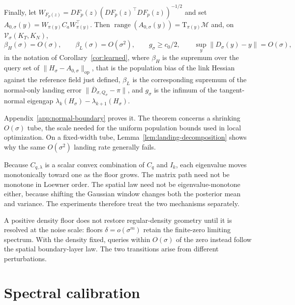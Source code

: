 \documentclass[10pt]{article}
\theoremstyle{c2fup}
\newcommand{\M}{\mathcal{M}}
\newcommand{\T}{\mathrm{T}}
\newcommand{\op}{\mathrm{op}}
\newcommand{\range}{\operatorname{range}}
\begin{document}
\begin{theorem}
Finally, let
$W_{F_p(z)}=DF_p(z)(DF_p(z)^\top DF_p(z))^{-1/2}$ and set
$A_{0,\sigma}(y)=W_{\pi(y)}C_aW_{\pi(y)}^\top$.  Then
$\range(A_{0,\sigma}(y))=\T_{\pi(y)}\M$ and, on
$\mathcal V_\sigma(K_T,K_N)$,
\begin{equation}
  \beta_H(\sigma)=O(\sigma),\qquad
  \beta_L(\sigma)=O(\sigma^2),\qquad
  g_\sigma\ge c_0/2,\qquad
  \sup_y\|D_\sigma(y)-y\|=O(\sigma),
  \label{eq:normal-boundary-rates}
\end{equation}
in the notation of Corollary~\ref{cor:learned}, where $\beta_H$ is the
supremum over the query set of $\|H_\sigma-A_{0,\sigma}\|_\op$, that is the
population bias of the link Hessian against the reference field just defined,
$\beta_L$ is the corresponding supremum of the normal-only landing error
$\|\overline D_{\sigma,Q_\sigma}-\pi\|$, and $g_\sigma$ is the infimum of the
tangent-normal eigengap $\lambda_k(H_\sigma)-\lambda_{k+1}(H_\sigma)$.
\end{theorem}

Appendix~\ref{app:normal-boundary} proves it.  The theorem concerns a shrinking $O(\sigma)$ tube, the scale needed for the
uniform population bounds used in local optimization.  On a fixed-width
tube, Lemma~\ref{lem:landing-decomposition} shows why the same
$O(\sigma^2)$ landing rate generally fails.

Because $C_{q,\lambda}$ is a scalar convex combination of $C_q$ and $I_k$, each eigenvalue moves monotonically toward one as the floor grows.  The matrix path need not be monotone in Loewner order.  The spatial law need not be eigenvalue-monotone either, because shifting the Gaussian window changes both the posterior mean and variance.  The experiments therefore treat the two mechanisms separately.

\begin{takeawaybox}
A positive density floor does not restore regular-density geometry until it is resolved at the noise scale: floors $\delta=o(\sigma^m)$ retain the finite-zero limiting spectrum.  With the density fixed, queries within $O(\sigma)$ of the zero instead follow the spatial boundary-layer law.  The two transitions arise from different perturbations.
\end{takeawaybox}

\section{Spectral calibration}
\label{sec:calibration}
\end{document}
